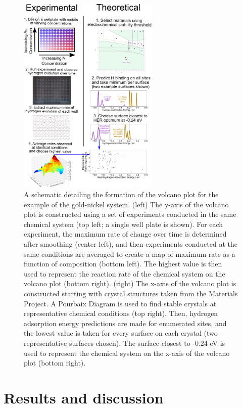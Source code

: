 \documentclass[preprint,12pt]{elsarticle}
\begin{document}
\begin{figure}[H]
\centering
    \includegraphics[width=0.6\textwidth]{figures/fig_3.pdf}
\caption{A schematic detailing the formation of the volcano plot for the example of the gold-nickel system. (left) The y-axis of the volcano plot is constructed using a set of experiments conducted in the same chemical system (top left; a single well plate is shown). For each experiment, the maximum rate of change over time is determined after smoothing (center left), and then experiments conducted at the same conditions are averaged to create a map of maximum rate as a function of composition (bottom left). The highest value is then used to represent the reaction rate of the chemical system on the volcano plot (bottom right). (right) The x-axis of the volcano plot is constructed starting with crystal structures taken from the Materials Project. A Pourbaix Diagram is used to find stable crystals at representative chemical conditions (top right). Then, hydrogen adsorption energy predictions are made for enumerated sites, and the lowest value is taken for every surface on each crystal (two representative surfaces chosen). The surface closest to -0.24 eV is used to represent the chemical system on the x-axis of the volcano plot (bottom right).
}
\end{figure}

\section{Results and discussion}\label{Section:Results}
\end{document}
